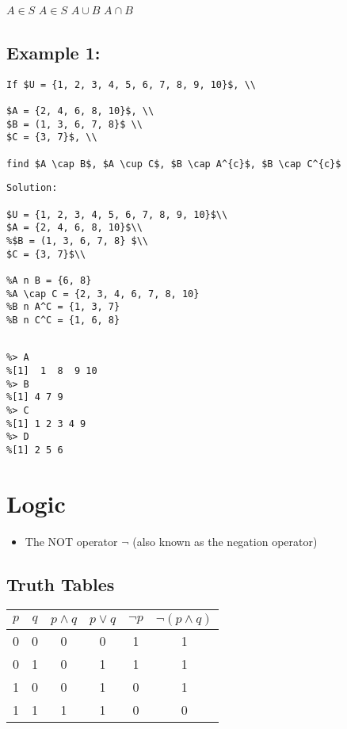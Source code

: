 \documentclass[12pt]{article} %
\begin{document}
$ A \in S$
$ A \in S$
$ A \cup B$
$ A \cap B$
\subsection*{Example 1: }
\begin{verbatim}
If $U = {1, 2, 3, 4, 5, 6, 7, 8, 9, 10}$, \\

$A = {2, 4, 6, 8, 10}$, \\
$B = (1, 3, 6, 7, 8}$ \\
$C = {3, 7}$, \\

find $A \cap B$, $A \cup C$, $B \cap A^{c}$, $B \cap C^{c}$
\end{verbatim}
\begin{verbatim}
Solution: 

$U = {1, 2, 3, 4, 5, 6, 7, 8, 9, 10}$\\
$A = {2, 4, 6, 8, 10}$\\
%$B = (1, 3, 6, 7, 8} $\\
$C = {3, 7}$\\

%A n B = {6, 8}
%A \cap C = {2, 3, 4, 6, 7, 8, 10}
%B n A^C = {1, 3, 7}
%B n C^C = {1, 6, 8}
\end{verbatim}
\begin{verbatim}

%> A
%[1]  1  8  9 10
%> B
%[1] 4 7 9
%> C
%[1] 1 2 3 4 9
%> D
%[1] 2 5 6
\end{verbatim}



\section{Logic}
\begin{itemize}
\item The NOT operator $\neg$ (also known as the negation operator)
\end{itemize}
\subsection{Truth Tables}
{
\Large
\begin{center}
\begin{tabular}{|c|c||c|c||c|c|}
\hline $p$ & $q$ & $p \wedge q$ & $p\vee q$ & $\neg p$  & $\neg (p \wedge q)$ \\ 
\hline 0 & 0 & 0 & 0 & 1 & 1 \\ 
\hline 0 & 1 & 0 & 1 & 1 & 1 \\ 
\hline 1 & 0 & 0 & 1 & 0 & 1 \\ 
\hline 1 & 1 & 1 & 1 & 0 & 0 \\ 
\hline 
\end{tabular} 
\end{center}
}
\end{document}
